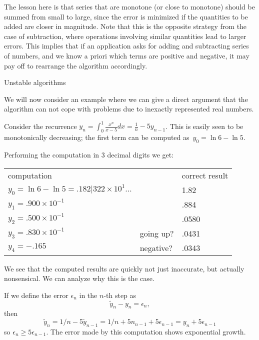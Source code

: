 The lesson here is that series that are monotone (or close to
monotone) should be summed from small to large, since the error is
minimized if the quantities to be added are closer in magnitude. Note
that this is the opposite strategy from the case of subtraction, where
operations involving similar quantities lead to larger errors. This
implies that if an application asks for adding and subtracting series
of numbers, and we know a priori which terms are positive and
negative, it may pay off to rearrange the algorithm accordingly.


 {Unstable algorithms}

We will now consider an example where we can give a direct argument
that the algorithm can not cope with problems due to inexactly
represented real numbers.

Consider the recurrence
$y_n=\int_0^1 \frac{x^n}{x-5}dx = \frac1n-5y_{n-1}$.
This is easily seen to be monotonically decreasing; the first term can
be computed as~$y_0=\ln 6 - \ln 5$.

Performing the computation in 3 decimal digits we get:

\begin{tabular}{lll}
  computation&&correct result\\
  $y_0=\ln 6 - \ln 5=.182|322\times 10^{1}\ldots$&&1.82\\
  $y_1=.900\times 10^{-1}$&&.884\\
  $y_2=.500\times 10^{-1}$&&.0580\\
  $y_3=.830\times 10^{-1}$&going up?&.0431\\
  $y_4=-.165$&negative?&.0343
\end{tabular}

We see that the computed results are quickly not just inaccurate, but
actually nonsensical. We can analyze why this is the case.

If we define the error $\epsilon_n$ in the $n$-th step as
\[ \tilde y_n-y_n=\epsilon_n,\] then
\[ \tilde y_n=1/n-5\tilde y_{n-1}=1/n+5n_{n-1}+5\epsilon_{n-1}
    = y_n+5\epsilon_{n-1} \]
so $\epsilon_n\geq 5\epsilon_{n-1}$. The error made by this
computation shows exponential growth.

